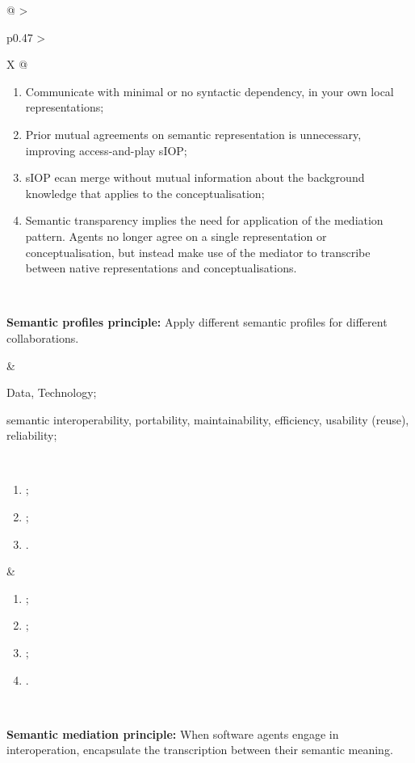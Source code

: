 \begin{xltabular}[l]{\linewidth}{@{} >{\small\raggedright\arraybackslash}p{0.47\linewidth} >{\small\raggedright\arraybackslash}X @{}}
\begin{enumerate}[left=10pt, nosep]
  \item Communicate with minimal or no syntactic dependency, in your own local representations;
  \item Prior mutual agreements on semantic representation is unnecessary, improving access-and-play sIOP;
  \item sIOP ecan merge without mutual information about the background knowledge that applies to the conceptualisation;
  \item Semantic transparency implies the need for application of the mediation pattern. Agents no longer agree on a single representation or conceptualisation, but instead make use of the mediator to transcribe between native representations and conceptualisations.
\end{enumerate} \\
%
%
%
\begin{mmdp}\label{dp:sprof}{\bfseries Semantic profiles principle:}
\quad Apply different semantic profiles for different collaborations. \end{mmdp}
&
\begin{description}[labelwidth=3.7cm,leftmargin=3.7cm+1ex,nosep,topsep=2ex,labelsep=1ex,font=\bfseries]
\item[Type of information:] Data, Technology;
\item[Quality attributes:] semantic interoperability, portability, maintainability, efficiency, usability (reuse), reliability;
\end{description}
\\
\begin{enumerate}[left=6pt, nosep]
  \item ;
  \item ;
  \item .
\end{enumerate}
&
\begin{enumerate}[left=10pt, nosep]
  \item ;
  \item ;
  \item ;
  \item .
\end{enumerate} \\
%
%
%
\begin{mmdp}\label{dp:mediation}{\bfseries Semantic mediation principle:}
\quad When software agents engage in interoperation, encapsulate the transcription between their semantic meaning.\end{mmdp}

\end{xltabular}
